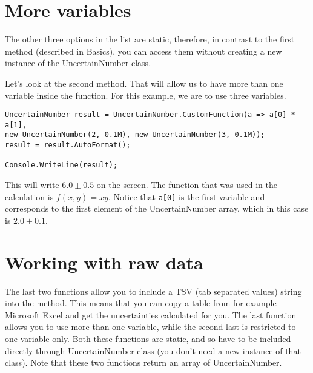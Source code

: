 \section{More variables}
The other three options in the list are static, therefore, in contrast to the first method (described in Basics), you can access them without creating a new instance of the UncertainNumber class.

Let's look at the second method. That will allow us to have more than one variable inside the function. For this example, we are to use three variables.
\begin{lstlisting}
UncertainNumber result = UncertainNumber.CustomFunction(a => a[0] * a[1],
new UncertainNumber(2, 0.1M), new UncertainNumber(3, 0.1M));
result = result.AutoFormat();

Console.WriteLine(result);
\end{lstlisting}
This will write $6.0 \pm 0.5$ on the screen. The function that was used in the calculation is $f(x,y)=xy$. Notice that \verb|a[0]| is the first variable and corresponds to the first element of the UncertainNumber array, which in this case is $2.0\pm 0.1$.

\section{Working with raw data}
The last two functions allow you to include a TSV (tab separated values) string into the method. This means that you can copy a table from for example Microsoft Excel and get the uncertainties calculated for you. The last function allows you to use more than one variable, while the second last is restricted to one variable only. Both these functions are static, and so have to be included directly through UncertainNumber class (you don't need a new instance of that class). Note that these two functions return an array of UncertainNumber.